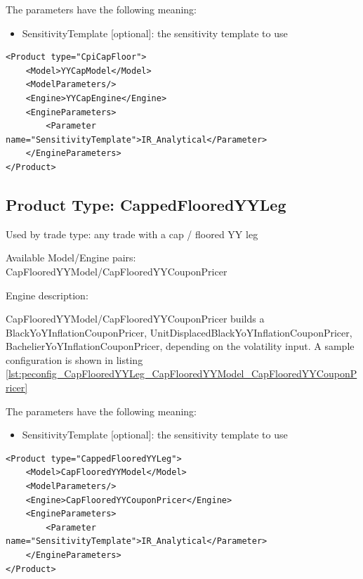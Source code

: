 The parameters have the following meaning:

\begin{itemize}
\item SensitivityTemplate [optional]: the sensitivity template to use
\end{itemize}

\begin{longlisting}
\begin{verbatim}
<Product type="CpiCapFloor">
    <Model>YYCapModel</Model>
    <ModelParameters/>
    <Engine>YYCapEngine</Engine>
    <EngineParameters>
        <Parameter name="SensitivityTemplate">IR_Analytical</Parameter>
    </EngineParameters>
</Product>
\end{verbatim}
\caption{Configuration for Product YYCapFloor, Model YYCapModel, Engine YYCapEngine}
\label{lst:peconfig_YYCapFloor_YYCapModel_YYCapEngine}
\end{longlisting}

\subsection{Product Type: CappedFlooredYYLeg}

Used by trade type: any trade with a cap / floored YY leg

Available Model/Engine pairs: CapFlooredYYModel/CapFlooredYYCouponPricer

Engine description:

CapFlooredYYModel/CapFlooredYYCouponPricer builds a BlackYoYInflationCouponPricer,
UnitDisplacedBlackYoYInflationCouponPricer, BachelierYoYInflationCouponPricer, depending on the volatility input. A
sample configuration is shown in listing \ref{lst:peconfig_CapFlooredYYLeg_CapFlooredYYModel_CapFlooredYYCouponPricer}

The parameters have the following meaning:

\begin{itemize}
\item SensitivityTemplate [optional]: the sensitivity template to use
\end{itemize}

\begin{longlisting}
\begin{verbatim}
<Product type="CappedFlooredYYLeg">
    <Model>CapFlooredYYModel</Model>
    <ModelParameters/>
    <Engine>CapFlooredYYCouponPricer</Engine>
    <EngineParameters>
        <Parameter name="SensitivityTemplate">IR_Analytical</Parameter>
    </EngineParameters>
</Product>
\end{verbatim}
\caption{Configuration for Product CapFlooredYYLeg, Model CapFlooredYYModel, Engine CapFlooredYYCouponPricer}
\label{lst:peconfig_CapFlooredYYLeg_CapFlooredYYModel_CapFlooredYYCouponPricer}
\end{longlisting}

